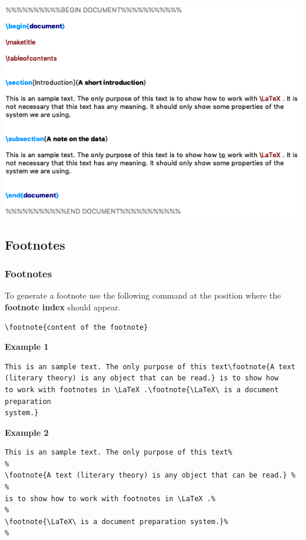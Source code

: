 \begin{frame}[fragile]

\centering
\includegraphics[width=0.84\linewidth]{../../texfiles-beamer/tex-material/WissArb-latex/xelatexTest4tex}


\end{frame}


\subsection{Footnotes}

\begin{frame}[fragile]
\frametitle{Footnotes}

To generate a footnote use the following command at the position where the \textbf{footnote index} should appear. 

\begin{lstlisting}
\footnote{content of the footnote}
\end{lstlisting}

\noindent \textbf{Example 1}
\begin{lstlisting}
This is an sample text. The only purpose of this text\footnote{A text 
(literary theory) is any object that can be read.} is to show how 
to work with footnotes in \LaTeX .\footnote{\LaTeX\ is a document preparation 
system.}
\end{lstlisting}

\pause 

\noindent \textbf{Example 2}
\begin{lstlisting}
This is an sample text. The only purpose of this text%
%
\footnote{A text (literary theory) is any object that can be read.} %
%
is to show how to work with footnotes in \LaTeX .%
%
\footnote{\LaTeX\ is a document preparation system.}%
%
\end{lstlisting}

\end{frame}


